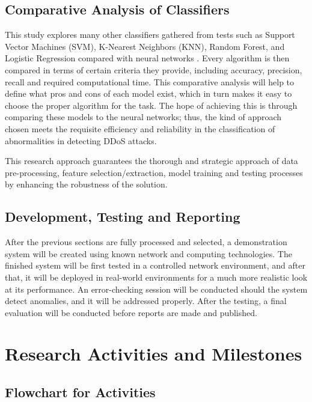 \documentclass[a4paper, 12pt]{article}
\begin{document}
\subsection{ Comparative Analysis of Classifiers }

This study explores many other classifiers gathered from tests such as Support Vector Machines (SVM), K-Nearest Neighbors (KNN), Random Forest, and Logistic Regression compared with neural networks . Every algorithm is then compared in terms of certain criteria they provide, including accuracy, precision, recall and required computational time. This comparative analysis will help to define what pros and cons of each model exist, which in turn makes it easy to choose the proper algorithm for the task. The hope of achieving this is through comparing these models to the neural networks; thus, the kind of approach chosen meets the requisite efficiency and reliability in the classification of abnormalities in detecting DDoS attacks.

This research approach guarantees the thorough and strategic approach of data pre-processing, feature selection/extraction, model training and testing processes by enhancing the robustness of the solution.

\subsection { Development, Testing and Reporting }

After the previous sections are fully processed and selected, a demonstration system will be created using known network and computing technologies. The finished system will be first tested in a controlled network environment, and after that, it will be deployed in real-world environments for a much more realistic look at its performance. An error-checking session will be conducted should the system detect anomalies, and it will be addressed properly. After the testing, a final evaluation will be conducted before reports are made and published. 

\clearpage

\section{Research Activities and Milestones}

\subsection{Flowchart for Activities}
\end{document}
